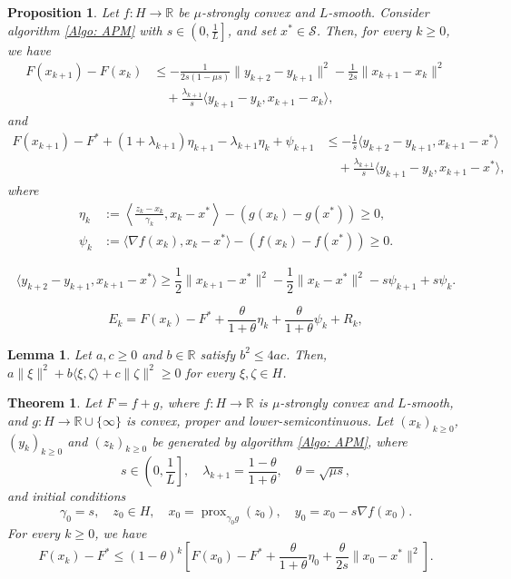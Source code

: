 \documentclass[10pt,a4paper]{amsart}
\newtheorem{proposition}{Proposition}
\newtheorem{lemma}{Lemma}
\newtheorem{theorem}{Theorem}
\newcommand{\R}{\mathbb{R}}
\DeclareMathOperator{\prox}{prox}
\begin{document}
\begin{proposition}\label{Prop: F_estimate}
Let $f:H\to\R$ be $\mu$-strongly convex and $L$-smooth. Consider algorithm \eqref{Algo: APM} with $s\in\left( 0,\frac{1}{L} \right]$, and set $x^*\in\mathcal{S}$. Then, for every $k\ge 0$, we have
\begin{align*}
F(x_{k+1}) - F(x_k) 
&\le - \frac{1}{2s(1-\mu s)} \| y_{k+2} - y_{k+1} \|^2 
    - \frac{1}{2s}\| x_{k+1} - x_k \|^2 \\
&\quad + \frac{\lambda_{k+1}}{s} \langle y_{k+1}-y_k, x_{k+1} - x_k \rangle, 
\end{align*}
and
\begin{align*}
F(x_{k+1}) - F^* + (1+\lambda_{k+1})\eta_{k+1} - \lambda_{k+1} \eta_k + \psi_{k+1} 
&\le - \frac{1}{s} \langle y_{k+2}-y_{k+1}, x_{k+1}-x^* \rangle \\
&\quad + \frac{\lambda_{k+1}}{s} \langle y_{k+1}-y_k, x_{k+1} - x^* \rangle,
\end{align*}
where
\begin{align*}
\eta_k &:= \left\langle \frac{z_k-x_k}{\gamma_k}, x_k - x^* \right\rangle - \left( g(x_k) - g(x^*) \right)\ge 0,\\
\psi_k &:= \langle \nabla f(x_k), x_k - x^* \rangle - \left( f(x_k) - f(x^*) \right) \ge 0.
\end{align*}
\end{proposition}

\begin{equation}\label{E: key_inequality}
\langle y_{k+2}-y_{k+1}, x_{k+1}-x^* \rangle \ge \frac{1}{2}\| x_{k+1}-x^* \|^2 - \frac{1}{2}\| x_k-x^* \|^2 - s\psi_{k+1} + s \psi_k.
\end{equation}

\begin{equation}\label{E: E_k_SC}
E_k = F(x_k) - F^* + \frac{\theta}{1+\theta}\eta_k + \frac{\theta}{1+\theta}\psi_k + R_k,
\end{equation}

\begin{lemma}\label{Lem: quadratic_positive}
Let $a,c\ge 0$ and $b\in\mathbb{R}$ satisfy $b^2\le 4ac$. Then, $a\| \xi \|^2 + b\langle \xi,\zeta \rangle + c\| \zeta \|^2 \ge 0$ for every $\xi,\zeta\in H$.
\end{lemma}

\begin{theorem}
Let $F=f+g$, where $f:H\to\mathbb{R}$ is $\mu$-strongly convex and $L$-smooth, and $g:H\to\mathbb{R}\cup\{\infty\}$ is convex, proper and lower-semicontinuous. Let $(x_k)_{k\ge 0}$, $(y_k)_{k\ge 0}$ and $(z_k)_{k\ge 0}$ be generated by algorithm \eqref{Algo: APM}, where
$$ s\in\left( 0,\frac{1}{L} \right],\quad \lambda_{k+1} = \frac{1-\theta}{1+\theta},\quad \theta = \sqrt{\mu s}, $$ 
and initial conditions
$$ \gamma_0 = s,\quad z_0\in H,\quad x_0=\prox_{\gamma_0g}(z_0),\quad y_0=x_0-s\nabla f(x_0).$$
For every $k\ge 0$, we have
$$ F(x_k) - F^* \le (1-\theta)^k\left[ F(x_0) - F^* + \frac{\theta}{1+\theta}\eta_0 + \frac{\theta}{2s}\| x_0 - x^* \|^2 \right]. $$
\end{theorem}
\end{document}
